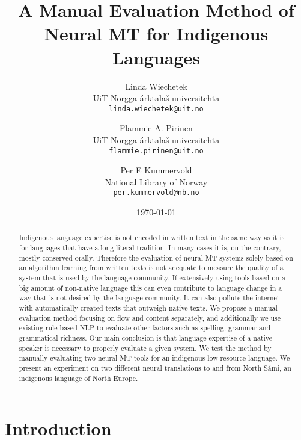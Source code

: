\documentclass{flammie}
\title{A Manual Evaluation Method of Neural MT for Indigenous Languages}
\author{Linda Wiechetek \\
  \small{UiT Norgga árktalaš universitehta} \\
  \texttt{linda.wiechetek@uit.no} \\\and%
  Flammie A. Pirinen \\
  \small{UiT Norgga árktalaš universitehta} \\
  \texttt{flammie.pirinen@uit.no} \\\and%
  Per E Kummervold \\
  \small{National Library of Norway} \\
  \texttt{per.kummervold@nb.no} \\}
\date{\today}
\begin{document}
\maketitle

\begin{abstract}


Indigenous language expertise is not encoded in written text in the same way as
it is for languages that have a long literal tradition. In many cases it is,
on the contrary, mostly conserved orally.  Therefore the evaluation of
neural MT systems solely based on an algorithm learning from written texts
is not adequate to measure the quality of a system that is used by the
language community.  If extensively using tools based on a big amount of
non-native language this can even contribute to language change in a way
that is not desired by the language community. It can also pollute the
internet with automatically created texts that outweigh native texts.  We
propose a manual evaluation method focusing on flow and content separately,
and additionally we use existing rule-based NLP to evaluate other factors
such as spelling, grammar and grammatical richness. Our main conclusion is
that language expertise of a native speaker is necessary to properly
evaluate a given system.  We test the method by manually evaluating two
neural MT tools for an indigenous low resource language.  We present an
experiment on two different neural translations to and from North Sámi, an
indigenous language of North Europe.






\end{abstract}


\section{Introduction}
\end{document}
